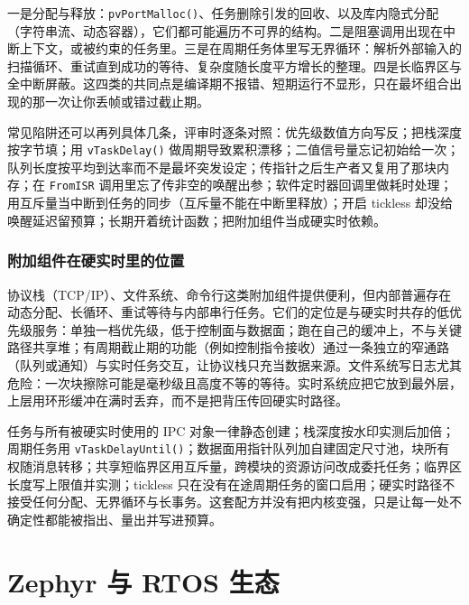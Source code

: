 \documentclass[12pt,a4paper,fontset=fandol]{ctexbook}
\newcommand{\Fn}[1]{\texttt{#1()}}
\newcommand{\Tp}[1]{\texttt{#1}}
\begin{document}
\begin{warning}[title={硬实时路径上的四类禁用动作}]
一是分配与释放：\Fn{pvPortMalloc}、任务删除引发的回收、以及库内隐式分配（字符串流、动态容器），它们都可能遍历不可界的结构。二是阻塞调用出现在中断上下文，或被约束的任务里。三是在周期任务体里写无界循环：解析外部输入的扫描循环、重试直到成功的等待、复杂度随长度平方增长的整理。四是长临界区与全中断屏蔽。这四类的共同点是编译期不报错、短期运行不显形，只在最坏组合出现的那一次让你丢帧或错过截止期。
\end{warning}

常见陷阱还可以再列具体几条，评审时逐条对照：优先级数值方向写反；把栈深度按字节填；用 \Fn{vTaskDelay} 做周期导致累积漂移；二值信号量忘记初始给一次；队列长度按平均到达率而不是最坏突发设定；传指针之后生产者又复用了那块内存；在 \Tp{FromISR} 调用里忘了传非空的唤醒出参；软件定时器回调里做耗时处理；用互斥量当中断到任务的同步（互斥量不能在中断里释放）；开启 tickless 却没给唤醒延迟留预算；长期开着统计函数；把附加组件当成硬实时依赖。

\subsection{附加组件在硬实时里的位置}

协议栈（TCP/IP）、文件系统、命令行这类附加组件提供便利，但内部普遍存在动态分配、长循环、重试等待与内部串行任务。它们的定位是与硬实时共存的低优先级服务：单独一档优先级，低于控制面与数据面；跑在自己的缓冲上，不与关键路径共享堆；有周期截止期的功能（例如控制指令接收）通过一条独立的窄通路（队列或通知）与实时任务交互，让协议栈只充当数据来源。文件系统写日志尤其危险：一次块擦除可能是毫秒级且高度不等的等待。实时系统应把它放到最外层，上层用环形缓冲在满时丢弃，而不是把背压传回硬实时路径。

\begin{bestpractice}[title={本章的默认工程配方}]
任务与所有被硬实时使用的 IPC 对象一律静态创建；栈深度按水印实测后加倍；周期任务用 \Fn{vTaskDelayUntil}；数据面用指针队列加自建固定尺寸池，块所有权随消息转移；共享短临界区用互斥量，跨模块的资源访问改成委托任务；临界区长度写上限值并实测；tickless 只在没有在途周期任务的窗口启用；硬实时路径不接受任何分配、无界循环与长事务。这套配方并没有把内核变强，只是让每一处不确定性都能被指出、量出并写进预算。
\end{bestpractice}

\chapter{Zephyr 与 RTOS 生态}
\label{ch:ch07-zephyr-ecosystem}
\end{document}
